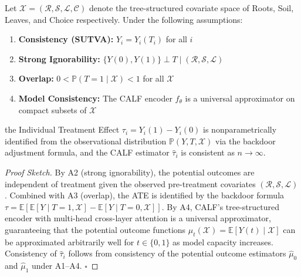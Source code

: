 
\begin{theorem}
\label{thm:identification}
Let $\mathcal{X} = (\mathcal{R}, \mathcal{S}, \mathcal{L}, \mathcal{C})$ denote the
tree-structured covariate space of Roots, Soil, Leaves, and Choice respectively.
Under the following assumptions:
\begin{enumerate}[label=\textbf{A\arabic*}]
    \item \textbf{Consistency (SUTVA):} $Y_i = Y_i(T_i)$ for all $i$
    \item \textbf{Strong Ignorability:}
          $\{Y(0), Y(1)\} \perp T \mid (\mathcal{R}, \mathcal{S}, \mathcal{L})$
    \item \textbf{Overlap:} $0 < \mathbb{P}(T=1 \mid \mathcal{X}) < 1$ for all $\mathcal{X}$
    \item \textbf{Model Consistency:} The CALF encoder $f_\theta$ is a
          universal approximator on compact subsets of $\mathcal{X}$
\end{enumerate}
the Individual Treatment Effect $\tau_i = Y_i(1) - Y_i(0)$ is nonparametrically
identified from the observational distribution $\mathbb{P}(Y, T, \mathcal{X})$ via
the backdoor adjustment formula, and the CALF estimator $\hat{\tau}_i$ is
consistent as $n \to \infty$.
\end{theorem}

\begin{proof}[Proof Sketch]
By A2 (strong ignorability), the potential outcomes are independent of treatment
given the observed pre-treatment covariates $(\mathcal{R}, \mathcal{S}, \mathcal{L})$.
Combined with A3 (overlap), the ATE is identified by the backdoor formula
$\tau = \mathbb{E}[\mathbb{E}[Y \mid T=1, \mathcal{X}] - \mathbb{E}[Y \mid T=0, \mathcal{X}]]$.
By A4, CALF's tree-structured encoder with multi-head cross-layer attention
is a universal approximator, guaranteeing that the potential outcome functions
$\mu_t(\mathcal{X}) = \mathbb{E}[Y(t) \mid \mathcal{X}]$ can be approximated
arbitrarily well for $t \in \{0, 1\}$ as model capacity increases.
Consistency of $\hat{\tau}_i$ follows from consistency of the potential outcome
estimators $\hat{\mu}_0$ and $\hat{\mu}_1$ under A1--A4. $\square$
\end{proof}
